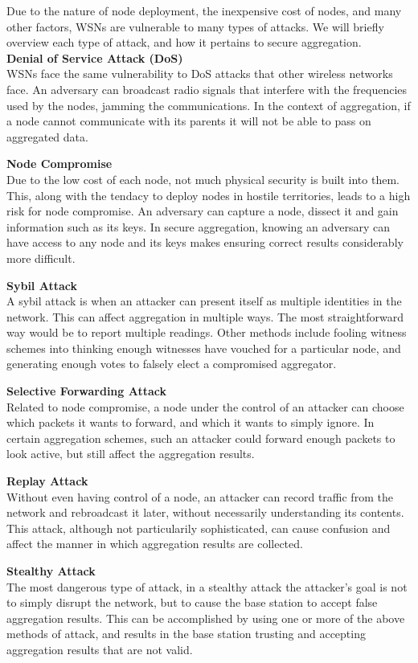 \documentclass[a4paper]{article}
\begin{document}
Due to the nature of node deployment, the inexpensive cost of nodes, and many
other factors, WSNs are vulnerable to many types of attacks. We will briefly
overview each type of attack, and how it pertains to secure aggregation.\\

{\bf Denial of Service Attack (DoS)} \\
WSNs face the same vulnerability to DoS attacks that other wireless
networks face. An adversary can broadcast radio signals that interfere with
the frequencies used by the nodes, jamming the communications. In the context
of aggregation, if a node cannot communicate with its parents it will not be
able to pass on aggregated data.

{\bf Node Compromise} \\
Due to the low cost of each node, not much physical security is built into
them. This, along with the tendacy to deploy nodes in hostile territories,
leads to a high risk for node compromise. An adversary can capture a node,
dissect it and gain information such as its keys. In secure aggregation,
knowing an adversary can have access to any node and its keys makes ensuring
correct results considerably more difficult.

{\bf Sybil Attack} \\
A sybil attack is when an attacker can present itself as multiple identities
in the network. This can affect aggregation in multiple ways. The most
straightforward way would be to report multiple readings. Other methods
include fooling witness schemes into thinking enough witnesses have vouched
for a particular node, and generating enough votes to falsely elect a
compromised aggregator.

{\bf Selective Forwarding Attack} \\
Related to node compromise, a node under the control of an attacker can choose
which packets it wants to forward, and which it wants to simply ignore. In
certain aggregation schemes, such an attacker could forward enough packets to
look active, but still affect the aggregation results.

{\bf Replay Attack} \\
Without even having control of a node, an attacker can record traffic from the
network and rebroadcast it later, without necessarily understanding its
contents. This attack, although not particularily sophisticated, can cause
confusion and affect the manner in which aggregation results are collected.

{\bf Stealthy Attack} \\
The most dangerous type of attack, in a stealthy attack the attacker's goal is
not to simply disrupt the network, but to cause the base station to accept
false aggregation results. This can be accomplished by using one or more of
the above methods of attack, and results in the base station trusting and
accepting aggregation results that are not valid.
\end{document}
